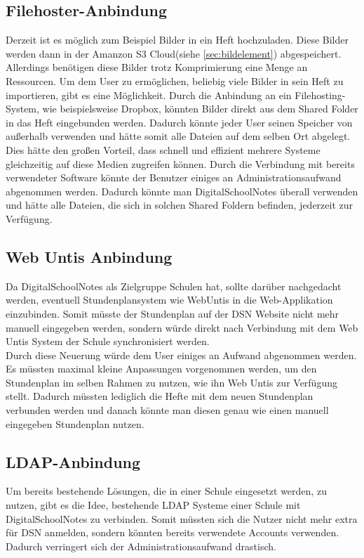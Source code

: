 \subsection{Filehoster-Anbindung}
Derzeit ist es möglich zum Beispiel Bilder in ein Heft hochzuladen. Diese Bilder werden dann in der Amanzon S3 Cloud(siehe \ref{sec:bildelement}) abgespeichert. Allerdings benötigen diese Bilder trotz Komprimierung eine Menge an Ressourcen. Um dem User zu ermöglichen, beliebig viele Bilder in sein Heft zu importieren, gibt es eine Möglichkeit. Durch die Anbindung an ein Filehosting-System, wie beispielsweise Dropbox, könnten Bilder direkt aus dem Shared Folder in das Heft eingebunden werden. Dadurch könnte jeder User seinen Speicher von außerhalb verwenden und hätte somit alle Dateien auf dem selben Ort abgelegt.\\
Dies hätte den großen Vorteil, dass schnell und effizient mehrere Systeme gleichzeitig auf diese Medien zugreifen können. Durch die Verbindung mit bereits verwendeter Software könnte der Benutzer einiges an Administrationsaufwand abgenommen werden. Dadurch könnte man DigitalSchoolNotes überall verwenden und hätte alle Dateien, die sich in solchen Shared Foldern befinden, jederzeit zur Verfügung. 

\newpage

\subsection{Web Untis Anbindung}
Da DigitalSchoolNotes als Zielgruppe Schulen hat, sollte darüber nachgedacht werden, eventuell Stundenplansystem wie WebUntis in die Web-Applikation einzubinden. Somit müsste der Stundenplan auf der DSN Website nicht mehr manuell eingegeben werden, sondern würde direkt nach Verbindung mit dem Web Untis System der Schule synchronisiert werden.\\
Durch diese Neuerung würde dem User einiges an Aufwand abgenommen werden. Es müssten maximal kleine Anpassungen vorgenommen werden, um den Stundenplan im selben Rahmen zu nutzen, wie ihn Web Untis zur Verfügung stellt. Dadurch müssten lediglich die Hefte mit dem neuen Stundenplan verbunden werden und danach könnte man diesen genau wie einen manuell eingegeben Stundenplan nutzen. 

\subsection{LDAP-Anbindung}
Um bereits bestehende Lösungen, die in einer Schule eingesetzt werden, zu nutzen, gibt es die Idee, bestehende LDAP Systeme einer Schule mit DigitalSchoolNotes zu verbinden. Somit müssten sich die Nutzer nicht mehr extra für DSN anmelden, sondern könnten bereits verwendete Accounts verwenden. Dadurch verringert sich der Administrationsaufwand drastisch.

